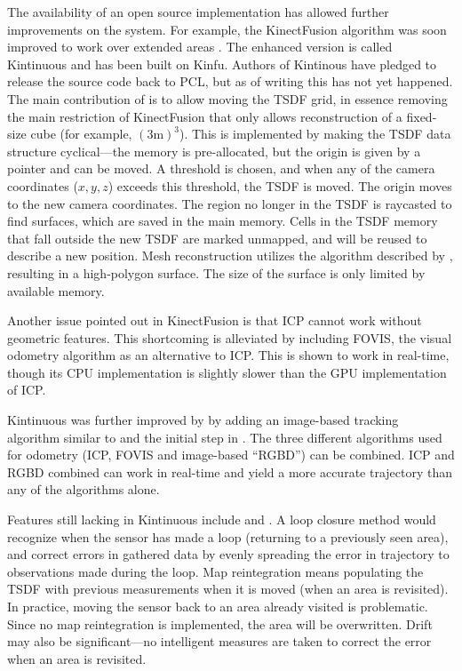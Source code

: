 The availability of an open source implementation has allowed further improvements on the system. For example, the KinectFusion algorithm was soon improved to work over extended areas \citep{Whelan12rssw}. The enhanced version is called Kintinuous and has been built on Kinfu. Authors of Kintinous have pledged to release the source code back to PCL, but as of writing this has not yet happened. The main contribution of \citet{Whelan12rssw} is to allow moving the TSDF grid, in essence removing the main restriction of KinectFusion that only allows reconstruction of a fixed-size cube (for example, $(3 \mathrm{m})^3$). This is implemented by making the TSDF data structure cyclical---the memory is pre-allocated, but the origin is given by a pointer and can be moved. A threshold is chosen, and when any of the camera coordinates ($x, y, z$) exceeds this threshold, the TSDF is moved. The origin moves to the new camera coordinates. The region no longer in the TSDF is raycasted to find surfaces, which are saved in the main memory. Cells in the TSDF memory that fall outside the new TSDF are marked unmapped, and will be reused to describe a new position. Mesh reconstruction utilizes the algorithm described by \citet{Marton09ICRA}, resulting in a high-polygon surface. The size of the surface is only limited by available memory. \citep{Whelan12rssw}

Another issue pointed out in KinectFusion is that ICP cannot work without geometric features. This shortcoming is alleviated by including FOVIS, the visual odometry algorithm as an alternative to ICP. This is shown to work in real-time, though its CPU implementation is slightly slower than the GPU implementation of ICP. \citep{Whelan12rssw}

Kintinuous was further improved by \citet{Whelan12tr} by adding an image-based tracking algorithm similar to \citep{tykkala2011direct} and the initial step in \citep{huang2011visual}. The three different algorithms used for odometry (ICP, FOVIS and image-based ``RGBD'') can be combined. ICP and RGBD combined can work in real-time and yield a more accurate trajectory than any of the algorithms alone. \citep{Whelan12tr}

Features still lacking in Kintinuous include  and . A loop closure method would recognize when the sensor has made a loop (returning to a previously seen area), and correct errors in gathered data by evenly spreading the error in trajectory to observations made during the loop. Map reintegration means populating the TSDF with previous measurements when it is moved (when an area is revisited). In practice, moving the sensor back to an area already visited is problematic. Since no map reintegration is implemented, the area will be overwritten. Drift may also be significant---no intelligent measures are taken to correct the error when an area is revisited.


